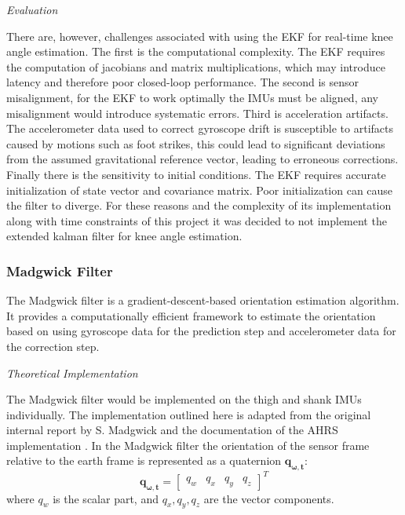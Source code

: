 \textit{Evaluation}

There are, however, challenges associated with using the EKF for real-time knee angle estimation. The first is the computational complexity. The EKF requires the computation of jacobians and matrix multiplications, which may introduce latency and therefore poor closed-loop performance. The second is sensor misalignment, for the EKF to work optimally the IMUs must be aligned, any misalignment would introduce systematic errors. Third is acceleration artifacts. The accelerometer data used to correct gyroscope drift is susceptible to artifacts caused by motions such as foot strikes, this could lead to significant deviations from the assumed gravitational reference vector, leading to erroneous corrections. Finally there is the sensitivity to initial conditions. The EKF requires accurate initialization of state vector and covariance matrix. Poor initialization can cause the filter to diverge. For these reasons and the complexity of its implementation along with time constraints of this project it was decided to not implement the extended kalman filter for knee angle estimation.



\subsubsection{Madgwick Filter}

The Madgwick filter is a gradient-descent-based orientation estimation algorithm. It provides a computationally efficient framework to estimate the orientation based on using gyroscope data for the prediction step and accelerometer data for the correction step. 
\newline

\textit{Theoretical Implementation}

The Madgwick filter would be implemented on the thigh and shank IMUs individually. The implementation outlined here is adapted from the original internal report by S. Madgwick  \cite{madgwick_ecient_nodate} and the documentation of the AHRS implementation \cite{noauthor_madgwick_nodate}. In the Madgwick filter the orientation of the sensor frame relative to the earth frame is represented as a quaternion \( \mathbf{q_{\omega , t}} \):
\[
\mathbf{q_{\omega , t}} = 
\begin{bmatrix}
q_w & q_x & q_y & q_z
\end{bmatrix}^T
\]
where \( q_w \) is the scalar part, and \( q_x, q_y, q_z \) are the vector components.
\newline

